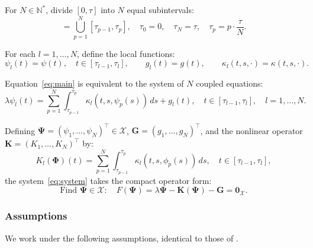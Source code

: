 \documentclass[12pt, a4paper]{article}
\newcommand{\N}{\mathbb{N}}
\begin{document}
For $N \in \N^*$, divide $[0, \tau]$ into $N$ equal
subintervals:
\begin{equation}
  [0, \tau] = \bigcup_{p=1}^{N} [\tau_{p-1}, \tau_p],
  \quad
  \tau_0 = 0, \quad \tau_N = \tau,
  \quad \tau_p = p \cdot \frac{\tau}{N}.
  \label{eq:decomp}
\end{equation}

For each $l = 1, \ldots, N$, define the local functions:
\begin{equation*}
  \psi_l(t) = \psi(t), \quad t \in [\tau_{l-1}, \tau_l],
  \qquad
  g_l(t) = g(t),
  \qquad
  \kappa_l(t, s, \cdot) = \kappa(t, s, \cdot).
\end{equation*}

Equation~\eqref{eq:main} is equivalent to the system of $N$
coupled equations:
\begin{equation}
  \lambda \psi_l(t) = \sum_{p=1}^{N}
  \int_{\tau_{p-1}}^{\tau_p}
  \kappa_l(t, s, \psi_p(s)) \, ds + g_l(t),
  \quad t \in [\tau_{l-1}, \tau_l],
  \quad l = 1, \ldots, N.
  \label{eq:system}
\end{equation}

Defining $\boldsymbol{\Psi} = (\psi_1, \ldots, \psi_N)^\top
\in \mathcal{X}$,
$\mathbf{G} = (g_1, \ldots, g_N)^\top$, and the nonlinear
operator $\mathbf{K} = (K_1, \ldots, K_N)^\top$ by:
\begin{equation}
  K_l(\boldsymbol{\Phi})(t) = \sum_{p=1}^{N}
  \int_{\tau_{p-1}}^{\tau_p}
  \kappa_l(t, s, \phi_p(s)) \, ds,
  \quad t \in [\tau_{l-1}, \tau_l],
  \label{eq:Kl}
\end{equation}
the system~\eqref{eq:system} takes the compact operator form:
\begin{equation}
  \text{Find } \boldsymbol{\Psi} \in \mathcal{X} :
  \quad F(\boldsymbol{\Psi}) =
  \lambda \boldsymbol{\Psi} - \mathbf{K}(\boldsymbol{\Psi})
  - \mathbf{G} = \mathbf{0}_\mathcal{X}.
  \label{eq:operator}
\end{equation}

\subsubsection{Assumptions}

We work under the following assumptions, identical to those
of \cite{sedka2025}.
\end{document}
